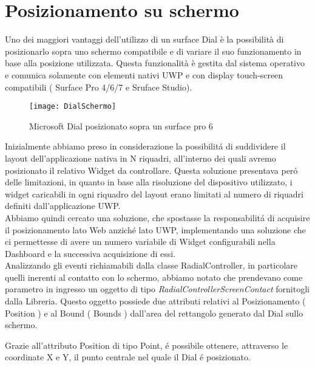 \section{Posizionamento su schermo}

Uno dei maggiori vantaggi dell’utilizzo di un surface Dial è la possibilità di posizionarlo sopra uno schermo compatibile e di variare il suo funzionamento in base alla posizione utilizzata.
Questa funzionalità è gestita dal sistema operativo e comunica solamente con elementi nativi UWP e con  display touch-screen compatibili ( Surface Pro 4/6/7 e Sruface Studio).

\begin{figure}[htpb!]
  \centering
  \texttt{[image: DialSchermo]}
  \caption{Microsoft Dial posizionato sopra un surface pro 6}
\end{figure}
Inizialmente abbiamo preso in considerazione la possibilitá di suddividere il layout dell’applicazione nativa in N riquadri, all’interno dei quali avremo posizionato il relativo Widget da controllare. Questa soluzione presentava peró delle limitazioni, in quanto in base alla risoluzione del dispositivo utilizzato, i widget caricabili in ogni riquadro del layout erano limitati al numero di riquadri definiti dall'applicazione UWP.\\
Abbiamo quindi cercato una soluzione, che spostasse la responsabilitá di acquisire il posizionamento lato Web anziché lato UWP, implementando una soluzione che ci permettesse di avere un numero variabile di Widget configurabili nella Dashboard e la successiva acquisizione di essi.\\

Analizzando gli eventi richiamabili dalla classe RadialController, in particolare quelli inerenti al contatto con lo schermo, abbiamo notato che prendevano come parametro in ingresso un oggetto di tipo \emph{RadialControllerScreenContact} fornitogli dalla Libreria. 
Questo oggetto possiede due attributi relativi al Posizionamento ( Position ) e al Bound ( Bounds ) dall'area del rettangolo generato dal Dial sullo schermo.

Grazie all’attributo Position di tipo Point, é possibile ottenere, attraverso le coordinate X e Y, il punto centrale nel quale il Dial é posizionato.

